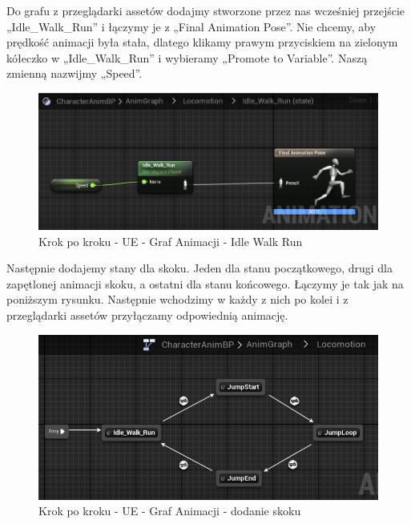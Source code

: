 \documentclass[12pt]{xmgr}
\begin{document}
Do grafu z przeglądarki assetów dodajmy stworzone przez nas wcześniej przejście „Idle\_Walk\_Run” i łączymy je z „Final Animation Pose”.  Nie chcemy, aby prędkość animacji była stała, dlatego klikamy prawym przyciskiem na zielonym kółeczko w „Idle\_Walk\_Run” i wybieramy „Promote to Variable”. Naszą zmienną nazwijmy „Speed”.

\begin{figure}[!htb]
    \begin{center}
    \includegraphics[scale=0.6]{Screeny/UeKrokPoKroku/UE-AnimGraph-IdleWalkRun.png}
    \end{center}
    \caption{Krok po kroku - UE - Graf Animacji - Idle Walk Run}
\end{figure}

\newpage
Następnie dodajemy stany dla skoku. Jeden dla stanu początkowego, drugi dla zapętlonej animacji skoku, a ostatni dla stanu końcowego. Łączymy je tak jak na poniższym rysunku. Następnie wchodzimy w każdy z nich po kolei i z przeglądarki assetów przyłączamy odpowiednią animację.

\begin{figure}[!htb]
    \begin{center}
    \includegraphics[scale=0.6]{Screeny/UeKrokPoKroku/UE-AnimGraph-Anim.png}
    \end{center}
    \caption{Krok po kroku - UE -  Graf Animacji - dodanie skoku}
\end{figure}
\end{document}
